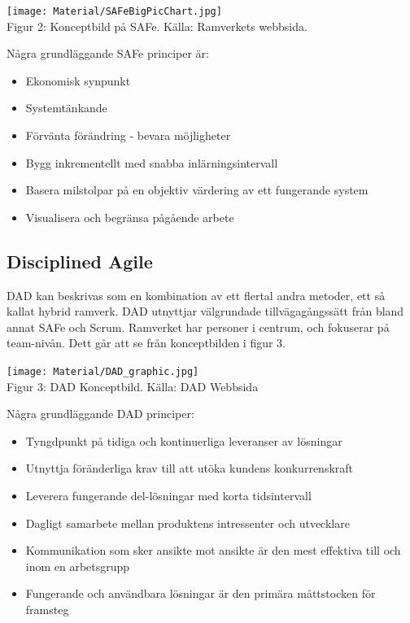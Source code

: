 		\begin{center}
			\texttt{[image: Material/SAFeBigPicChart.jpg]}
			\\ Figur 2: Konceptbild på SAFe. Källa: Ramverkets webbsida. \cite{safe_web}
		\end{center}
		Några grundläggande SAFe principer är: \cite{safe_principles}
		\begin{itemize}
			\item Ekonomisk synpunkt
			\item Systemtänkande
			\item Förvänta förändring - bevara möjligheter
			\item Bygg inkrementellt med snabba inlärningsintervall
			\item Basera milstolpar på en objektiv värdering av ett fungerande system
			\item Visualisera och begränsa pågående arbete
		\end{itemize}
			
		
	\subsection{Disciplined Agile}
			
			DAD kan beskrivas som en kombination av ett flertal andra metoder, ett så kallat hybrid ramverk. DAD utnyttjar välgrundade tillvägagångssätt från bland annat SAFe och Scrum.
			Ramverket har personer i centrum, och fokuserar på team-nivån. Dett går att se från konceptbilden i figur 3. \cite{dad_overview}
		\begin{center}
			\texttt{[image: Material/DAD\_graphic.jpg]}
			\\ Figur 3: DAD Konceptbild. Källa: DAD Webbsida \cite{dad_web}
		\end{center}
		Några grundläggande DAD principer: \cite{dad_principles}
		\begin{itemize}
			\item Tyngdpunkt på tidiga och kontinuerliga leveranser av lösningar
			\item Utnyttja föränderliga krav till att utöka kundens konkurrenskraft
			\item Leverera fungerande del-lösningar med korta tidsintervall
			\item Dagligt samarbete mellan produktens intressenter och utvecklare
			\item Kommunikation som sker ansikte mot ansikte är den mest effektiva till och inom en arbetsgrupp
			\item Fungerande och användbara lösningar är den primära måttstocken för framsteg
		\end{itemize}
			
